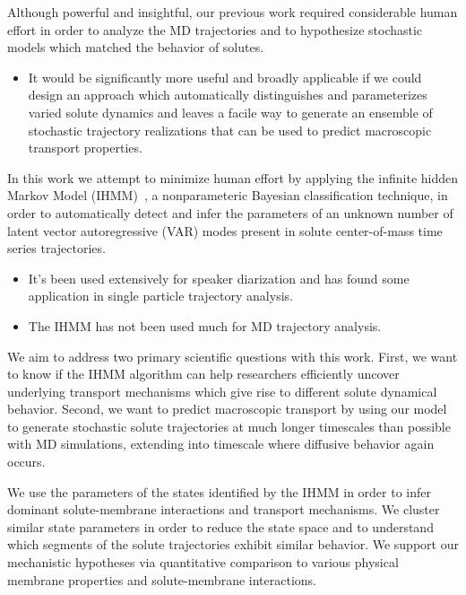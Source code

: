 \documentclass[journal=jpcbfk,manuscript=article]{achemso}
\begin{document}
  Although powerful and insightful, our previous work required considerable human effort
  in order to analyze the MD trajectories and to hypothesize stochastic models which
  matched the behavior of solutes.
  \begin{itemize}
    \item It would be significantly more useful and broadly applicable if we could 
    design an approach which automatically distinguishes and parameterizes varied solute 
    dynamics and leaves a facile way to generate an ensemble of stochastic trajectory
    realizations that can be used to predict macroscopic transport properties.
  \end{itemize}
  
  In this work we attempt to minimize human effort by applying the infinite hidden 
  Markov Model (IHMM)~\cite{beal_infinite_2002,calderon_inferring_2015}, a nonparameteric 
  Bayesian classification technique, in order to automatically detect and infer the 
  parameters of an unknown number of latent vector autoregressive (VAR) modes present 
  in solute center-of-mass time series trajectories. 
  \begin{itemize}
    \item It's been used extensively for speaker diarization and has found some application
    in single particle trajectory analysis.
    \item The IHMM has not been used much for MD trajectory analysis.

  \end{itemize}
  
  We aim to address two primary scientific 
  questions with this work. 
  First, we want
  to know if the IHMM algorithm can help researchers efficiently uncover underlying
  transport mechanisms which give rise to different solute dynamical behavior.
  Second, we want to predict macroscopic transport by using our model to generate 
  stochastic solute trajectories at much longer timescales than possible with MD simulations, 
  extending into timescale where diffusive behavior again occurs.
  
  We use the parameters of the states identified by the IHMM in order to infer 
  dominant solute-membrane interactions and transport mechanisms. We cluster similar 
  state parameters in order to reduce the state space and to understand which segments 
  of the solute trajectories exhibit similar behavior. We support our mechanistic 
  hypotheses via quantitative comparison to various physical membrane properties and
  solute-membrane interactions.
  
\end{document}
